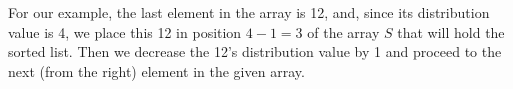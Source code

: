 \documentclass[preview]{standalone}
\begin{document}
\begin{center}
For our example, the last element in the array is 12, and, since its distribution value is 4, we place this 12 in position $4 - 1 = 3$ of the array $S$ that will hold the sorted list. Then we decrease the 12’s distribution value by 1 and proceed to the next (from the right) element in the given array.
\end{center}
\end{document}
